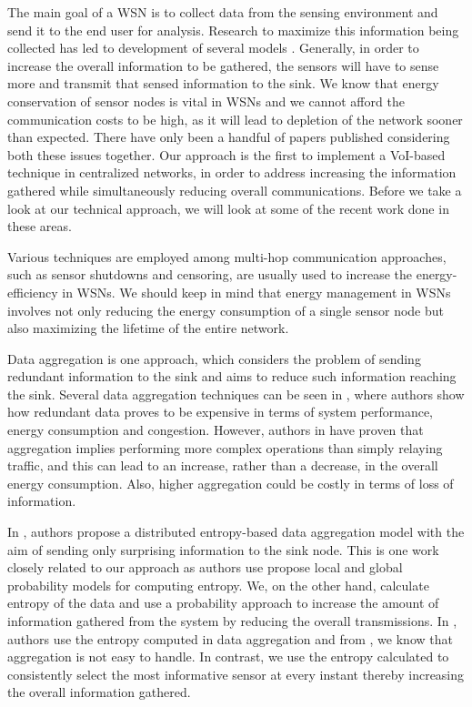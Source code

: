 The main goal of a WSN is to collect data from the sensing environment
and send it to the end user for analysis. Research to maximize this
information being collected has led to development of several models
\cite{abuarqoub2012overview}. Generally, in order to increase the
overall information to be gathered, the sensors will have to sense
more and transmit that sensed information to the sink. We know that
energy conservation of sensor nodes is vital in WSNs and we cannot
afford the communication costs to be high, as it will lead to
depletion of the network sooner than expected. There have only been a
handful of papers published considering both these issues together.
Our approach is the first to implement a VoI-based technique in
centralized networks, in order to address increasing the information
gathered while simultaneously reducing overall communications. Before
we take a look at our technical approach, we will look at some of the
recent work done in these areas.

Various techniques are employed among multi-hop communication
approaches, such as sensor shutdowns and censoring, are usually used
to increase the energy-efficiency in WSNs. We should keep in mind that
energy management in WSNs involves not only reducing the energy
consumption of a single sensor node but also maximizing the lifetime
of the entire network.

Data aggregation is one approach, which considers the problem of
sending redundant information to the sink and aims to reduce such
information reaching the sink. Several data aggregation techniques can
be seen in \cite{rajagopalan2006data}, where authors show how
redundant data proves to be expensive in terms of system performance,
energy consumption and congestion. However, authors in
\cite{galluccio2008efficient} have proven that aggregation implies
performing more complex operations than simply relaying traffic, and
this can lead to an increase, rather than a decrease, in the overall
energy consumption. Also, higher aggregation could be costly in terms
of loss of information.

In \cite{sinha2013performance}, authors propose a distributed
entropy-based data aggregation model with the aim of sending only
surprising information to the sink node. This is one work closely
related to our approach as authors use propose local and global
probability models for computing entropy. We, on the other hand,
calculate entropy of the data and use a probability approach to
increase the amount of information gathered from the system by
reducing the overall transmissions. In \cite{sinha2013performance},
authors use the entropy computed in data aggregation and from
\cite{galluccio2008efficient}, we know that aggregation is not easy to
handle. In contrast, we use the entropy calculated to consistently
select the most informative sensor at every instant thereby increasing
the overall information gathered.

